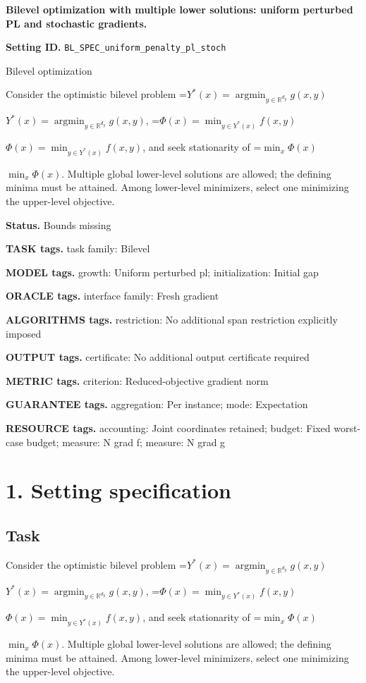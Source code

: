 \documentclass[10pt,a4paper]{article}
\newcommand{\AtlasMath}[1]{\par\begingroup\centering\setbox0=\hbox{$\displaystyle #1$}\ifdim\wd0>1.4\linewidth\typeout{ATLAS WIDE FORMULA: \the\wd0}\fi\ifdim\wd0>\linewidth\resizebox{\linewidth}{!}{\box0}\else\box0\fi\par\endgroup}
\newcommand{\AtlasInlineMath}[1]{\begingroup\setbox0=\hbox{$#1$}\ifdim\wd0>.4\linewidth\endgroup\AtlasMath{#1}\else\endgroup$#1$\fi}
\begin{document}
\raggedright

{\LARGE\bfseries\sffamily\color{AtlasNavy} Bilevel optimization with multiple lower solutions: uniform perturbed PL and stochastic gradients.\par}\vspace{5pt}
\textbf{Setting ID.} \texttt{BL\_\allowbreak{}SPEC\_\allowbreak{}uniform\_\allowbreak{}penalty\_\allowbreak{}pl\_\allowbreak{}stoch}

Bilevel optimization

Consider the optimistic bilevel problem \AtlasInlineMath{Y^*(x)=\operatorname*{argmin}_{y\in\mathbb{R}^{d_y}}g(x,y)}, \AtlasInlineMath{\Phi(x)=\min_{y\in Y^*(x)}f(x,y)}, and seek stationarity of \AtlasInlineMath{\min_x\Phi(x)}. Multiple global lower-level solutions are allowed; the defining minima must be attained. Among lower-level minimizers, select one minimizing the upper-level objective.

\textbf{Status.} Bounds missing

\textbf{TASK tags.} task family: Bilevel

\textbf{MODEL tags.} growth: Uniform perturbed pl; initialization: Initial gap

\textbf{ORACLE tags.} interface family: Fresh gradient

\textbf{ALGORITHMS tags.} restriction: No additional span restriction explicitly imposed

\textbf{OUTPUT tags.} certificate: No additional output certificate required

\textbf{METRIC tags.} criterion: Reduced-objective gradient norm

\textbf{GUARANTEE tags.} aggregation: Per instance; mode: Expectation

\textbf{RESOURCE tags.} accounting: Joint coordinates retained; budget: Fixed worst-case budget; measure: N grad f; measure: N grad g

\section{1. Setting specification}
\subsection{Task}
Consider the optimistic bilevel problem \AtlasInlineMath{Y^*(x)=\operatorname*{argmin}_{y\in\mathbb{R}^{d_y}}g(x,y)}, \AtlasInlineMath{\Phi(x)=\min_{y\in Y^*(x)}f(x,y)}, and seek stationarity of \AtlasInlineMath{\min_x\Phi(x)}. Multiple global lower-level solutions are allowed; the defining minima must be attained. Among lower-level minimizers, select one minimizing the upper-level objective.
\end{document}
